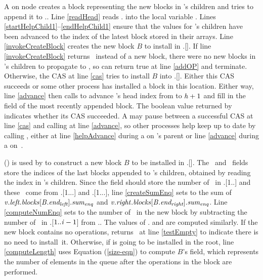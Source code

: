 A  on node  creates a block representing the new blocks
in 's
children and tries to append it to .. 
Line \ref{readHead} reads . into the local variable .
Lines \ref{startHelpChild1}--\ref{endHelpChild1} ensure that the  values
for 's children have been advanced to the index of the latest block stored in their  arrays.
Line \ref{invokeCreateBlock} creates the new block $B$ to install in .[].
If line \ref{invokeCreateBlock} returns \nl\ instead of a new block, there were no new blocks in 's children to propagate to , so  can return true at line \ref{addOP} and terminate.
Otherwise, the CAS at line \ref{cas} tries to install $B$ into .[].
Either this CAS succeeds or some other process has installed a  block in this location.
Either way, line \ref{advance} then calls  to advance 's head index 
from  to $\mbox{\textnormal{\textit{h}}}+1$
and fill in the  field of the most recently appended block.
The boolean value returned by  indicates whether its CAS succeeded.
A  may pause between a successful CAS at line \ref{cas} and calling  at line \ref{advance},
so other processes help keep  up to date by  calling , 
either at line \ref{helpAdvance} during a  on 's parent or line \ref{advance} during a  on~.

() is used
by  to construct a new block $B$ to be installed in .[].
The \eleft\ and \eright\ fields store the indices of the last blocks appended to 's
children, obtained by reading the  index in 's children.
Since the  field should store the number of \enqueues\ in
.[1..] and these \enqueues\ come from .[1...\eleft] and .[1...\eright], line \ref{createSumEnq} sets
 to the sum of $\mbox{\textnormal{\textit{v}}}.\mbox{\textit{left.blocks}}[\mbox{\textnormal{\textit{B}}}.\mbox{\textit{end\textsubscript{left}}}].\mbox{\textit{sum\textsubscript{enq}}}$ and $\mbox{\textnormal{\textit{v}}}.\mbox{\textit{right}}.\mbox{\textit{blocks}}[\mbox{\textnormal{\textit{B}}}.\mbox{\textit{end\textsubscript{right}}}].\mbox{\textit{sum\textsubscript{enq}}}$.
Line \ref{computeNumEnq} sets  to the number of \enqueues\ in the new block by
subtracting  the number of \enqueues\ in .[$1..\mbox{\textnormal{\textit{i}}}-1$] from ..
The values of . and  are computed similarly.
If the new block contains no operations,  returns \nl\ at line \ref{testEmpty} to indicate
 there is no need to install~it.
Otherwise, if 
is going to be installed in the root, line \ref{computeLength} uses Equation (\ref{size-eqn}) to compute $B$'s  field, which
represents the number of elements in the queue after the operations in the block are performed.


